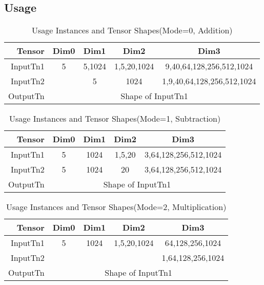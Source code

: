 \documentclass[•]{article}
\begin{document}
\subsection{Usage}


\begin{table}[h]
\caption{Usage Instances and Tensor Shapes(Mode=0, Addition)}
\label{tab:shapes_matops}
	\begin{center}
		\begin{tabular}{|r|c|c|c|c|} 
		\hline	
		Tensor  & Dim0 & Dim1 & Dim2 & Dim3\\ 
		\hline	
		InputTn1 &
			5 &
			5,1024 &
			1,5,20,1024 &
			9,40,64,128,256,512,1024\\
		\hline	
		InputTn2 &
			 &
			5 &
			1024 &
			1,9,40,64,128,256,512,1024\\	
		\hline
		OutputTn &
			\multicolumn{4}{|c|}{Shape of InputTn1} \\
		\hline
		\end{tabular}
	\end{center}
\end{table}

\begin{table}[h]
\caption{Usage Instances and Tensor Shapes(Mode=1, Subtraction)}
\label{tab:shapes_matops}
	\begin{center}
		\begin{tabular}{|r|c|c|c|c|} 
		\hline	
		Tensor  & Dim0 & Dim1 & Dim2 & Dim3\\ 
		\hline	
		InputTn1 &
			5 &
			1024 &
			1,5,20 &
			3,64,128,256,512,1024\\
		\hline	
		InputTn2 &
			5 &
			1024 &
			20 &
			3,64,128,256,512,1024\\	
		\hline
		OutputTn &
			\multicolumn{4}{|c|}{Shape of InputTn1} \\
		\hline
		\end{tabular}
	\end{center}
\end{table}

\begin{table}[h]
\caption{Usage Instances and Tensor Shapes(Mode=2, Multiplication)}
\label{tab:shapes_matops}
	\begin{center}
		\begin{tabular}{|r|c|c|c|c|} 
		\hline	
		Tensor  & Dim0 & Dim1 & Dim2 & Dim3\\ 
		\hline	
		InputTn1 &
			5 &
			1024 &
			1,5,20,1024 &
			64,128,256,1024\\
		\hline	
		InputTn2 &
			 &
			 &
			 &
			1,64,128,256,1024\\	
		\hline
		OutputTn &
			\multicolumn{4}{|c|}{Shape of InputTn1} \\
		\hline
		\end{tabular}
	\end{center}
\end{table}
\end{document}
